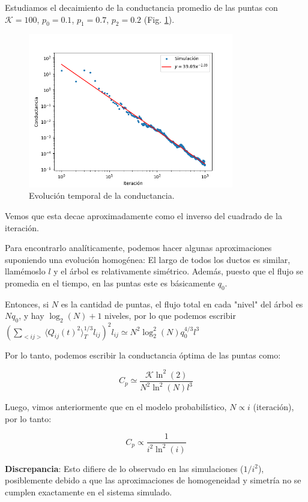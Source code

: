 \documentclass{article}
\begin{document}
Estudiamos el decaimiento de la conductancia promedio de las puntas con $\mathcal{K}=100$, $p_0 = 0.1$, $p_1 = 0.7$, $p_2 = 0.2$ (Fig. \ref{fig:evolucion_conductancia_proba}).

\begin{figure}[h!]
    \centering
    \includegraphics[width=0.8\textwidth]{graficos_proba/Cij_vs_tiempo.png}
    \caption{Evolución temporal de la conductancia.}
    \label{fig:evolucion_conductancia_proba}
\end{figure}

Vemos que esta decae aproximadamente como el inverso del cuadrado de la iteración.

Para encontrarlo analíticamente, podemos hacer algunas aproximaciones suponiendo una evolución homogénea: El largo de todos los ductos es similar, llamémoslo $l$ y el árbol es relativamente simétrico. Además, puesto que el flujo se promedia en el tiempo, en las puntas este es básicamente $q_0$.

Entonces, si $N$ es la cantidad de puntas, el flujo total en cada "nivel" del árbol es $Nq_0$, y hay $\log_2(N)+1$ niveles, por lo que podemos escribir $\left( \sum_{<ij>} \langle Q_{ij}(t)^2\rangle_T^{1/3} l_{ij}\right)^2 l_{ij} \simeq N^{2}\log_2^{2}(N)q_0^{4/3}l^{3}$

Por lo tanto, podemos escribir la conductancia óptima de las puntas como:

$$ C_p \simeq \dfrac{\mathcal{K} \ln^2(2)}{N^{2}\ln^{2}(N)l^{3}} $$

Luego, vimos anteriormente que en el modelo probabilístico, $N \propto i$ (iteración), por lo tanto:

$$ C_p \propto \frac{1}{i^2 \ln^2(i)} $$

\textbf{Discrepancia}: Esto difiere de lo observado en las simulaciones ($1/i^2$), posiblemente debido a que las aproximaciones de homogeneidad y simetría no se cumplen exactamente en el sistema simulado.
\end{document}
